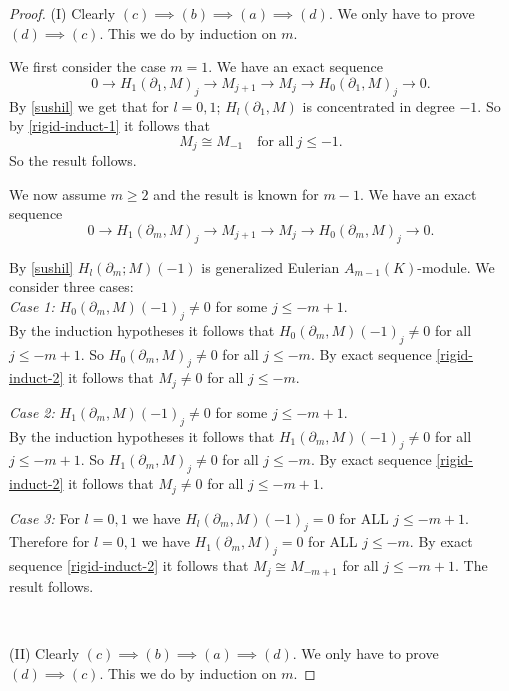 \documentclass{amsart}
\newcommand{\rt}{\rightarrow}
\theoremstyle{plain}
\theoremstyle{definition}
\theoremstyle{remark}
\begin{document}
\begin{proof}
 (I) Clearly $(c) \implies (b) \implies (a) \implies (d)$. We only have to prove
 $(d) \implies (c)$. This we do by induction on $m$.
 
 We first consider the case $m = 1$.
 We have an exact sequence
 \begin{equation}
  \label{rigid-induct-1}
  0 \rt H_1(\partial_1, M)_j \rt M_{j+1} \rt M_j \rt H_0(\partial_1, M)_j \rt 0.
 \end{equation}
By \ref{sushil} we get that  for $l = 0,1$; $H_l(\partial_1, M)$ is concentrated in degree $-1$.
So by \ref{rigid-induct-1} it follows that 
\[
 M_j \cong M_{-1} \quad \text{for all} \ j \leq -1.
\]
So the result follows.

We now assume $m \geq 2$ and the result is known for $m-1$. We have an exact sequence
 \begin{equation}
  \label{rigid-induct-2}
  0 \rt H_1(\partial_m, M)_j \rt M_{j+1} \rt M_j \rt H_0(\partial_m, M)_j \rt 0.
 \end{equation}

By \ref{sushil} $H_l(\partial_m; M)(-1)$ is generalized Eulerian $A_{m-1}(K)$-module. We consider three cases:\\
\textit{Case 1:} $H_0(\partial_m, M)(-1)_j \neq 0$ for some $j \leq -m + 1$. \\
By the induction hypotheses it follows that $H_0(\partial_m, M)(-1)_j \neq 0$ for all $j \leq -m +1$.
So $H_0(\partial_m, M)_j \neq 0$ for all $j \leq -m$. By exact sequence \ref{rigid-induct-2} it follows that $M_j \neq 0$
for all $j \leq -m$.

\textit{Case 2:} $H_1(\partial_m, M)(-1)_j \neq 0$ for some $j \leq -m + 1$. \\
By the induction hypotheses it follows that $H_1(\partial_m, M)(-1)_j \neq 0$ for all $j \leq -m +1$. So
$H_1(\partial_m, M)_j \neq 0$ for all $j \leq -m$. By exact sequence \ref{rigid-induct-2} it follows that $M_j \neq 0$
for all $j \leq -m + 1$.

\textit{Case 3:} For $l = 0,1$ we have  $H_l(\partial_m, M)(-1)_j = 0$ for ALL $j \leq -m + 1$. \\
Therefore for $l = 0,1$ we have  $H_1(\partial_m, M)_j = 0$ for ALL $j \leq -m$. 
By exact sequence \ref{rigid-induct-2} it follows that
$M_j \cong M_{-m+1}$ for all $j \leq -m +1$. The result follows.

\ 


(II) Clearly $(c) \implies (b) \implies (a) \implies (d)$. We only have to prove
 $(d) \implies (c)$. This we do by induction on $m$.
 

\end{proof}
\end{document}
